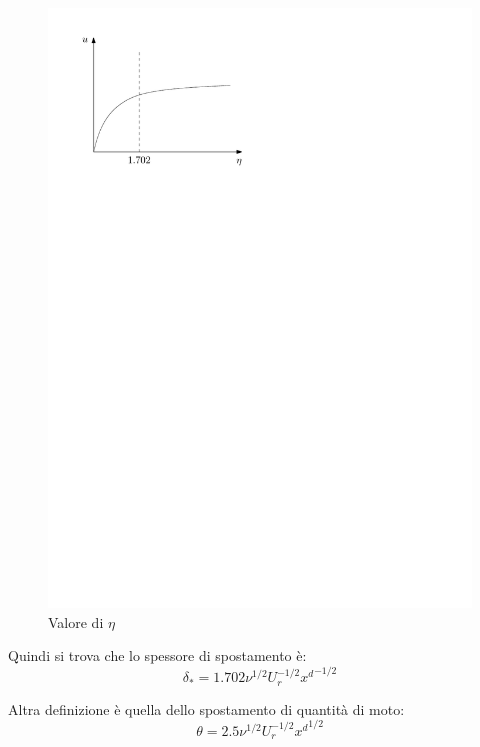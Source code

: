 	\begin{figure}[ht]
		\includegraphics[scale=0.8]{./7.4 Strato limite/7.4-8}
		\centering
		\caption{Valore di $\eta$}
	\end{figure}
%
Quindi si trova che lo spessore di spostamento è:
%
	\begin{equation*}
		\delta_* = 1.702 \nu^{1/2} U_r^{-1/2} {x^d}^{-1/2}	
	\end{equation*}
%	

Altra definizione è quella dello spostamento di quantità di moto:
%
	\begin{equation*}
		\theta = 2.5 \nu^{1/2} U_r^{-1/2} {x^d}^{1/2}
	\end{equation*}
%

